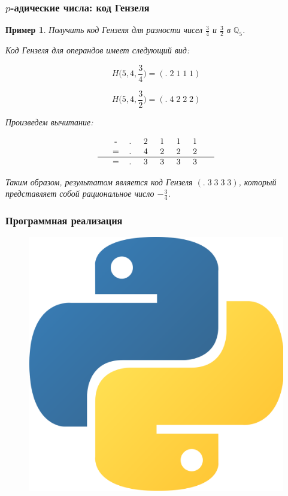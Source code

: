 \documentclass[10pt,professionalfont,utf8,presentation,compress]{beamer}
\theoremstyle{definition}
\theoremstyle{plain}
\newtheorem{exmp}{Пример}
\begin{document}
\begin{frame}
\frametitle{$p$-адические числа: код Гензеля}
\begin{exmp}
Получить код Гензеля для разности чисел $\frac{3}{4}$ и $\frac{3}{2}$ в $\mathbb{Q}_5$.

\noindent Код Гензеля для операндов имеет следующий вид:

$$H\bigg(5,4, \frac{3}{4}\bigg)=(.\; 2\; 1\; 1\; 1)$$

$$H\bigg(5,4, \frac{3}{2}\bigg)=(.\; 4\; 2\; 2\; 2)$$


\noindent Произведем вычитание:

$$
\begin{tabular}{ccccccccccc}
& - & .\; & 2\; & 1\; & 1\; & 1\; &  \\
& = & .\; & 4\; & 2\; & 2\; & 2\; &  \\
\hline
& = & .\; & 3\; & 3\; & 3\; & 3\; &
\end{tabular}
$$

\noindent Таким образом, результатом является код Гензеля $(.\; 3\; 3\; 3\; 3)$, который представляет собой рациональное число $-\frac{3}{4}$.
\end{exmp}
\end{frame}


\begin{frame}
\frametitle{Программная реализация}
	\begin{figure}[H]
	\centerline{\includegraphics[width=0.5\linewidth]{images/python.png}}
	\end{figure}
\end{frame}
\end{document}
